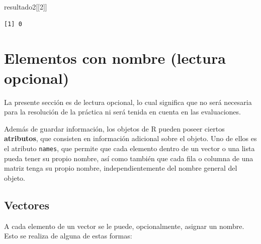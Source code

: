 \documentclass[
]{book}
\newenvironment{Shaded}{\begin{snugshade}}{\end{snugshade}}
\newcommand{\DecValTok}[1]{\textcolor[rgb]{0.00,0.00,0.81}{#1}}
\newcommand{\NormalTok}[1]{#1}
\begin{document}
\begin{Shaded}
\begin{Highlighting}[]
\NormalTok{resultado2[[}\DecValTok{2}\NormalTok{]]}
\end{Highlighting}
\end{Shaded}

\begin{verbatim}
[1] 0
\end{verbatim}

\hypertarget{elementos-con-nombre-lectura-opcional}{%
\section{Elementos con nombre (lectura opcional)}\label{elementos-con-nombre-lectura-opcional}}

La presente sección es de lectura opcional, lo cual significa que no será necesaria para la resolución de la práctica ni será tenida en cuenta en las evaluaciones.

Además de guardar información, los objetos de R pueden poseer ciertos \textbf{atributos}, que consisten en información adicional sobre el objeto. Uno de ellos es el atributo \texttt{names}, que permite que cada elemento dentro de un vector o una lista pueda tener su propio nombre, así como también que cada fila o columna de una matriz tenga su propio nombre, independientemente del nombre general del objeto.

\hypertarget{vectores}{%
\subsection{Vectores}\label{vectores}}

A cada elemento de un vector se le puede, opcionalmente, asignar un nombre. Esto se realiza de alguna de estas formas:
\end{document}
